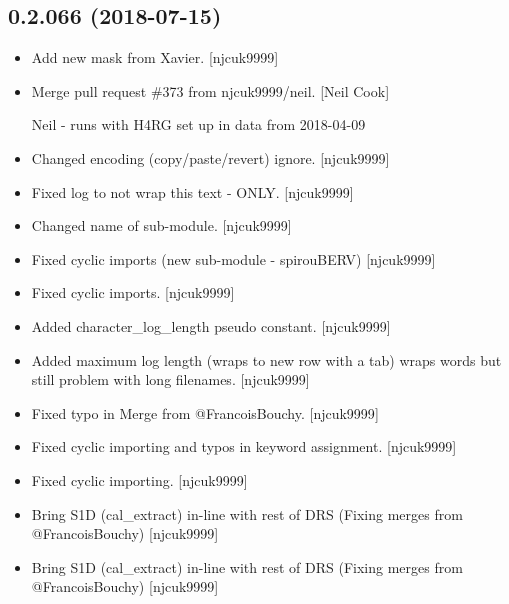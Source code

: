 \documentclass[a4paper,10pt,english]{report}
\begin{document}
\subsection{0.2.066 (2018-07-15)}
\label{\detokenize{misc/changelog:id391}}\begin{itemize}
\item {} 
Add new mask from Xavier. {[}njcuk9999{]}

\item {} 
Merge pull request \#373 from njcuk9999/neil. {[}Neil Cook{]}

Neil - runs with H4RG set up in data from 2018-04-09

\item {} 
Changed encoding (copy/paste/revert) \textendash{} ignore. {[}njcuk9999{]}

\item {} 
Fixed log to not wrap this text - ONLY. {[}njcuk9999{]}

\item {} 
Changed name of sub-module. {[}njcuk9999{]}

\item {} 
Fixed cyclic imports (new sub-module - spirouBERV) {[}njcuk9999{]}

\item {} 
Fixed cyclic imports. {[}njcuk9999{]}

\item {} 
Added character\_log\_length pseudo constant. {[}njcuk9999{]}

\item {} 
Added maximum log length (wraps to new row with a tab) wraps words but
still problem with long filenames. {[}njcuk9999{]}

\item {} 
Fixed typo in Merge from @FrancoisBouchy. {[}njcuk9999{]}

\item {} 
Fixed cyclic importing and typos in keyword assignment. {[}njcuk9999{]}

\item {} 
Fixed cyclic importing. {[}njcuk9999{]}

\item {} 
Bring S1D (cal\_extract) in-line with rest of DRS (Fixing merges from
@FrancoisBouchy) {[}njcuk9999{]}

\item {} 
Bring S1D (cal\_extract) in-line with rest of DRS (Fixing merges from
@FrancoisBouchy) {[}njcuk9999{]}


\end{itemize}
\end{document}
